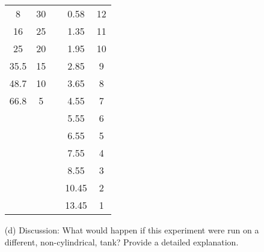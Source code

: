 \begin{problem}
\begin{enumerate}
\begin{center}
\begin{tabular}{|c|c|c|c|c|}
                    8      & 30  & &  0.58  &  12\\
                    16     & 25  & &  1.35  &  11\\
                    25     & 20  & &  1.95  &  10\\
                    35.5   & 15  & &  2.85  &  9\\
                    48.7   & 10  & &  3.65  &  8\\
                    66.8   & 5   & &  4.55  &  7\\
                    &     & &  5.55  &  6\\
                    &     & &  6.55  &  5\\
                    &     & &  7.55  &  4\\
                    &     & &  8.55  &  3\\
                    &     & &  10.45 &  2\\
                    &     & &  13.45 &  1\\\hline
                \end{tabular}
            \end{center}
        \item[(d)] Discussion: What would happen if this experiment were run on a different,
            non-cylindrical, tank? Provide a detailed explanation.
    \end{enumerate}
\end{problem}

